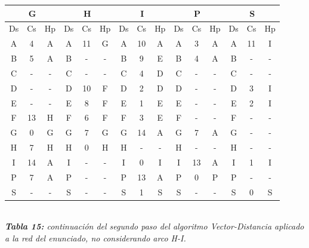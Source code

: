 \documentclass[letterpaper,10pt,onecolumn,titlepage]{article}
\begin{document}
  \begin{center}
   \begin{tabular}{|c|c|c|c|c|c|c|c|c|c|c|c|c|c|c|} \hline
     \multicolumn{3}{|c|}{G} & \multicolumn{3}{|c|}{H} &\multicolumn{3}{|c|}{I} & \multicolumn{3}{|c|}{P} & \multicolumn{3}{|c|}{S}    \\ \hline
     Ds & Cs & Hp & Ds & Cs & Hp & Ds & Cs & Hp & Ds & Cs & Hp & Ds & Cs & Hp  \\ \hline
     A  & 4  & A  & A  & \color{red}11  &\color{red} G  & A  & 10  & A  & A  & 3  & A  & A  & \color{red}11  &\color{red} I   \\ \hline
     B  & \color{red}5  & \color{red}A  & B  & -  & -  & B  & \color{red}9  & \color{red}E  & B  &\color{red} 4  & \color{red}A  & B  & -  & -   \\ \hline
     C  & -  & -  & C  & -  & -  & C  & \color{red}4  & \color{red}D  & C  & -  & -  & C  & -  & -   \\ \hline
     D  & -  & -  & D  & \color{red}10  & \color{red}F  & D  & 2  & D  & D  & -  & -  & D  &\color{red} 3  &\color{red} I   \\ \hline
     E  & -  & -  & E  & \color{red}8  & \color{red}F  & E  & 1  & E  & E  & -  & -  & E  & \color{red}2  &\color{red} I   \\ \hline
     F  & \color{red}13  & \color{red}H  & F  & 6  & F  & F  & \color{red}3  &\color{red} E  & F  & -  & -  & F  & -  & -   \\ \hline
     G  & 0  & G  & G  & 7  & G  & G  & \color{red}14  & \color{red}A  & G  & \color{red}7  & \color{red}A  & G  & -  & -   \\ \hline
     H  & 7  & H  & H  & 0  & H  & H  & -  & -  & H  & -  & -  & H  & -  & -   \\ \hline
     I  & \color{red}14  & \color{red}A  & I  & -  & -  & I  & 0  & I  & I  & \color{red}13  & \color{red}A  & I  & 1  & I   \\ \hline
     P  & \color{red}7  & \color{red}A  & P  & -  & -  & P  & \color{red}13  &\color{red} A  & P  & 0  & P  & P  & -  & -   \\ \hline
     S  & -  & -  & S  & -  & -  & S  & 1  & S  & S  & -  & -  & S  & 0  & S   \\ \hline
   \end{tabular}\\
   \textit{\textbf{Tabla 15:} continuación del segundo paso del algoritmo Vector-Distancia aplicado a la red del enunciado, no considerando arco H-I.}
 \end{center}
\end{document}
